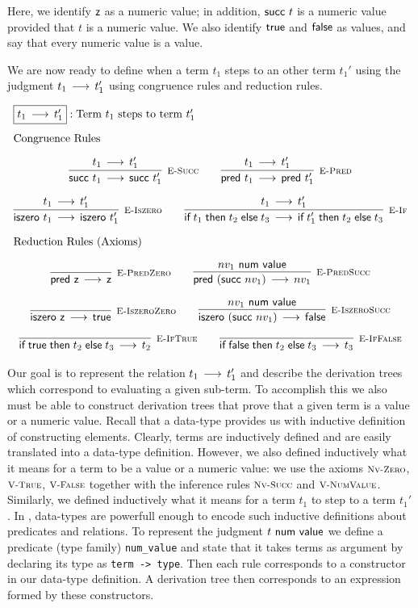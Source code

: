 Here, we identify $\textsf{z}$ as a numeric value; in addition, $\textsf{succ}~t$ is a
numeric value provided that $t$ is a numeric value. We also identify $\textsf{true}$
and $\textsf{false}$ as values, and say that every numeric value is a value.

We are now ready to define when a term $t_1$ steps to an other term $t_1'$ using
the judgment $t_1 \mathrel{\,\longrightarrow\,} t_1'$ using congruence rules and reduction rules.

\[
\begin{array}{c}
\multicolumn{1}{l}{\fbox{$t_1 \Steps t_1'$}: \mbox{Term $t_1$ steps to term $t_1'$}}
\\[1em]
\multicolumn{1}{l}{\mbox{\text{Congruence Rules}}}
\\[1em]
\infer[\ESucc]{\tmsucc t_1 \Steps \tmsucc t_1'}{t_1 \Steps t_1'}\qquad
\infer[\EPred]{\tmpred t_1 \Steps \tmpred t_1'}{t_1 \Steps t_1'}
\\[1em]
\infer[\EIsZero]{\tmiszero t_1 \Steps \tmiszero t_1'}{t_1 \Steps t_1'}\qquad
\infer[\EIf]{\tmif{t_1}{t_2}{t_3} \Steps \tmif{t_1'}{t_2}{t_3}}{t_1 \Steps t_1'}
\\[1em]
\multicolumn{1}{l}{\mbox{\text{Reduction Rules (Axioms)}}}
\\[1em]
\infer[\EPredZ]{\tmpred \tmzero \Steps \tmzero}{}\qquad
\infer[\EPredSucc]{\tmpred (\tmsucc nv_1) \Steps nv_1}{nv_1 \NumValue}
\\[1em]
\infer[\EIsZeroZ]{\tmiszero \tmzero \Steps \tmtrue}{} \qquad
\infer[\EIsZeroSucc]{\tmiszero (\tmsucc nv_1) \Steps \tmfalse}{nv_1 \NumValue}
\\[1em]
\infer[\EIfT]{\tmif \tmtrue {t_2}{t_3} \Steps t_2}{}\qquad
\infer[\EIfF]{\tmif \tmfalse {t_2}{t_3} \Steps t_3}{}
\end{array}
\]

Our  goal  is  to  represent  the  relation  $t_1 \mathrel{\,\longrightarrow\,} t_1'$ and  describe the
derivation trees which correspond to evaluating a given sub-term.
To accomplish this we also must be able to construct derivation trees that prove
that  a given  term is  a value  or a  numeric  value. Recall  that a  data-type
provides us with inductive definition of constructing elements.
Clearly,  terms  are  inductively  defined  and  are  easily  translated  into a
data-type definition. However,  we also defined inductively  what it means for a
term  to be a value or a numeric value:  we use the  axioms $\textsc{\footnotesize Nv-Zero}$, $\textsc{\footnotesize V-True}$,
$\textsc{\footnotesize V-False}$  together  with  the   inference  rules  $\textsc{\footnotesize Nv-Succ}$  and  $\textsc{\footnotesize V-NumValue}$.
Similarly,  we defined inductively  what it means for a term $t_1$  to step to a
term $t_1'$.
In \beluga, data-types are powerfull enough to encode such inductive definitions
about  predicates  and  relations.  To represent the judgment  $t ~\mathsf{num~value}$  we
define  a predicate (type family) \lstinline!num_value!  and state that it takes
terms as argument  by declaring its type as \lstinline!term -> type!.  Then each
rule corresponds to a constructor in our data-type definition. A derivation tree
then corresponds to an expression formed by these constructors.

